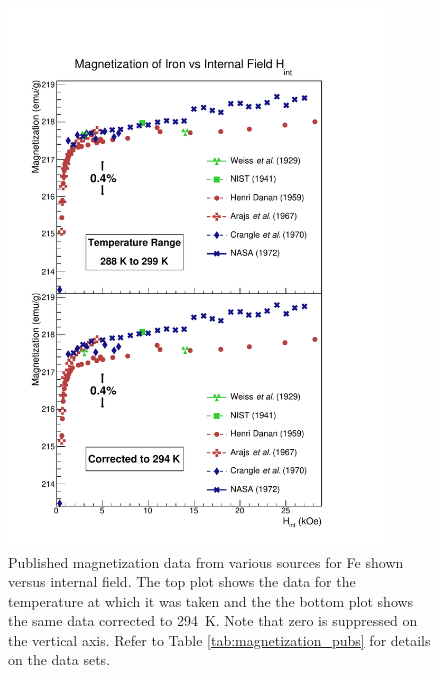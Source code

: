 \documentclass[preprint,12pt]{elsarticle}
\begin{document}
\begin{figure}[h!]
\centering
\includegraphics[width=0.9\textwidth]{FeMagnetization_vs_Hint.pdf}
\caption{Published magnetization data from various sources for Fe shown versus internal field. The top plot shows the data for the temperature at which it was taken and the the bottom plot shows the same data corrected to 294~K. Note that zero is suppressed on the vertical axis. Refer to Table \ref{tab:magnetization_pubs} for details on the data sets.}
\label{fig:mag_Fe}
\end{figure}
\end{document}
